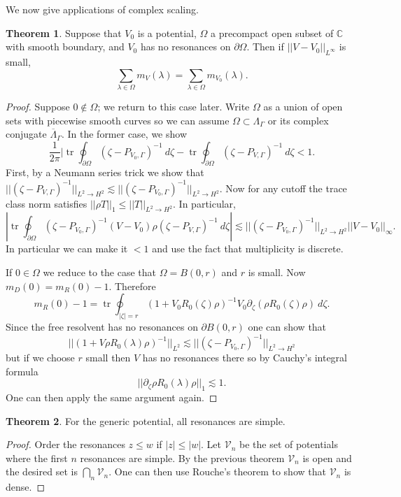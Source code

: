 \documentclass[12pt]{report}
\newcommand{\CC}{\mathbb{C}}
\newcommand{\tr}{\operatorname{tr}}
\theoremstyle{definition}
\newtheorem{theorem}{Theorem}[chapter]
\begin{document}
We now give applications of complex scaling.

\begin{theorem}
Suppose that $V_0$ is a potential, $\Omega$ a precompact open subset of $\CC$ with smooth boundary, and $V_0$ has no resonances on $\partial \Omega$. Then if $||V - V_0||_{L^\infty}$ is small,
$$\sum_{\lambda \in \Omega} m_V(\lambda) = \sum_{\lambda \in \Omega} m_{V_0}(\lambda).$$
\end{theorem}
\begin{proof}
Suppose $0 \notin \Omega$; we return to this case later. Write $\Omega$ as a union of open sets with piecewise smooth curves so we can assume $\Omega \subset \Lambda_\Gamma$ or its complex conjugate $\overline \Lambda_\Gamma$. In the former case, we show
$$\frac{1}{2\pi} |\tr \oint_{\partial \Omega} (\zeta - P_{V_0,\Gamma})^{-1}~d\zeta - \tr \oint_{\partial \Omega} (\zeta - P_{V,\Gamma})^{-1}~d\zeta < 1.$$
First, by a Neumann series trick we show that $||(\zeta - P_{V,\Gamma})^{-1}||_{L^2 \to H^2} \lesssim ||(\zeta - P_{V_0,\Gamma})^{-1}||_{L^2 \to H^2}$.
Now for any cutoff the trace class norm satisfies $||\rho T||_1 \leq ||T||_{L^2 \to H^2}$. In particular,
$$|\tr \oint_{\partial \Omega} (\zeta - P_{V_0,\Gamma})^{-1}(V - V_0)\rho(\zeta - P_{V,\Gamma})^{-1}~d\zeta| \lesssim ||(\zeta - P_{V_0,\Gamma})^{-1}||_{L^2 \to H^2} ||V - V_0||_\infty.$$
In particular we can make it $< 1$ and use the fact that multiplicity is discrete.

If $0 \in \Omega$ we reduce to the case that $\Omega = B(0, r)$ and $r$ is small. Now $m_D(0) = m_R(0) - 1$. Therefore
$$m_R(0) - 1 = \tr\oint_{|\zeta| = r} (1 + V_0R_0(\zeta)\rho)^{-1}V_0\partial_\zeta(\rho R_0(\zeta)\rho)~d\zeta.$$
Since the free resolvent has no resonances on $\partial B(0, r)$ one can show that
$$||(1 + V\rho R_0(\lambda)\rho)^{-1}||_{L^2} \lesssim ||(\zeta - P_{V_0,\Gamma})^{-1}||_{L^2 \to H^2}$$
but if we choose $r$ small then $V$ has no resonances there so by Cauchy's integral formula
$$||\partial_\zeta \rho R_0(\lambda) \rho||_1 \lesssim 1.$$
One can then apply the same argument again.
\end{proof}

\begin{theorem}
For the generic potential, all resonances are simple.
\end{theorem}
\begin{proof}
Order the resonances $z \leq w$ if $|z| \leq |w|$. Let $\mathcal V_n$ be the set of potentials where the first $n$ resonances are simple.
By the previous theorem $\mathcal V_n$ is open and the desired set is $\bigcap_n \mathcal V_n$.
One can then use Rouche's theorem to show that $\mathcal V_n$ is dense.
\end{proof}
\end{document}
